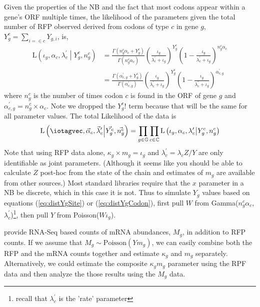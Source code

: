 \documentclass{article}
\newcommand{\alphac}{\ensuremath{{\alpha_c}}\xspace}
\newcommand{\alphacgprime}{\ensuremath{{\alpha_{c,g}^\prime}}\xspace}
\newcommand{\alphacvec}{\ensuremath{{\vec{\alpha}_c}}\xspace}
\newcommand{\lambdac}{\ensuremath{{\lambda_c}}\xspace}
\newcommand{\lambdacprime}{\ensuremath{{\lambda_c^\prime}}\xspace}
\newcommand{\lambdacprimevec}{\ensuremath{{\vec{\lambda}_c^\prime}}\xspace}
\newcommand{\ngc}{\ensuremath{{n_{g}^c}}\xspace}
\newcommand{\mg}{\ensuremath{{m_g}}\xspace}
\newcommand{\Mg}{\ensuremath{{M_g}}\xspace}
\newcommand{\iotag}{\ensuremath{{\iota_g}}\xspace}
\newcommand{\kappag}{\ensuremath{{\kappa_{g}}}\xspace}
\newcommand{\Ztheta}{\ensuremath{{Z}}\xspace}
\newcommand{\Yg}{\ensuremath{{Y_{g}}}\xspace}
\newcommand{\Ytotal}{\ensuremath{{Y}}\xspace}
\newcommand{\Ygi}{\ensuremath{{Y_{g,i}}}\xspace}
\newcommand{\Ygc}{\ensuremath{{Y_{g}^c}}\xspace}
\newcommand{\Lik}{\ensuremath{\text{L}}\xspace}
\newcommand{\setG}{\ensuremath{\mathbb{G}}\xspace}
\newcommand{\setC}{\ensuremath{\mathbb{C}}\xspace}
\newcommand{\Ygcvec}{\ensuremath{{\Vec{\Ygc}}}\xspace}
\newcommand{\ngcvec}{\ensuremath{{\Vec{\ngc}}}\xspace}
\begin{document}
Given the properties of the NB \citep[p.~141]{ForbesEtAl2011} and the fact that most codons appear within a gene's ORF multiple times, the likelihood of the parameters given the total number of RFP observed derived from codons of type $c$ in gene $g$, $\Ygc = \sum_{i=\in c} \Ygi$, is,
\begin{align}
  \Lik\left(\iotag, \alphac, \lambdacprime \middle| \Ygc, \ngc\right) &= \frac{\Gamma\left(\ngc \alphac + \Ygc\right)}{\Gamma\left(\ngc \alphac\right) } 
  \left(\frac{\iotag}{\lambdacprime + \iotag}\right)^\Ygc \left(1-\frac{\iotag}{\lambdacprime + \iotag}\right)^{\ngc \alphac}\\
\label{eq:distYgCodon}&= \frac{\Gamma\left(\alphacgprime + \Ygc\right)}{\Gamma\left(\alphacgprime\right)} 
  \left(\frac{\iotag}{\lambdacprime + \iotag}\right)^\Ygc \left(1-\frac{\iotag}{\lambdacprime + \iotag}\right)^{\alphacgprime}
\end{align}
where $\ngc$ is the number of times codon $c$ is found in the ORF of gene $g$ and $\alphacgprime = \ngc \times \alphac$.
Note we dropped the $\Ygc!$ term because that will be the same for all parameter values.
The total Likelihood of the data is
\begin{equation}
  \Lik\left(\iotagvec, \alphacvec, \lambdacprimevec \middle| \Ygcvec, \ngcvec\right) = \prod_{g \in \setG} \prod_{c \in \setC}  \Lik\left(\iotag, \alphac, \lambdacprime \middle| \Ygc, \ngc\right)
\end{equation}
Note that using RFP data alone, $\kappag \times \mg = \iotag$ and $\lambdacprime = \lambdac \Ztheta/\Ytotal$ are only identifiable as joint parameters. 
(Although it seems like you should be able to calculate \Ztheta post-hoc from the state of the chain and estimates of \mg are available from other sources.)
Most standard libraries require that the $x$ parameter in a NB be discrete, which in this case it is not.
Thus to simulate \Yg values based on equations (\ref{eq:distYgSite}) or (\ref{eq:distYgCodon}), first pull $W$ from Gamma(\ngc \alphac, \lambdacprime)\footnote{recall that \lambdacprime is the 'rate' parameter}, then pull $Y$ from Poisson($W \iotag$).
  
\citet{PopEtAl2014} provide RNA-Seq based counts of mRNA abundances, \Mg, in addition to RFP counts.
If we assume that $\Mg \sim \text{Poisson}(\Ytotal \mg)$, we can easily combine both the RFP and the mRNA counts together and estimate $\kappag$ and $\mg$ separately.
Alternatively, we could estimate the composite \kappag \mg parameter using the RPF data and then analyze the those results using the \Mg data.
\end{document}
